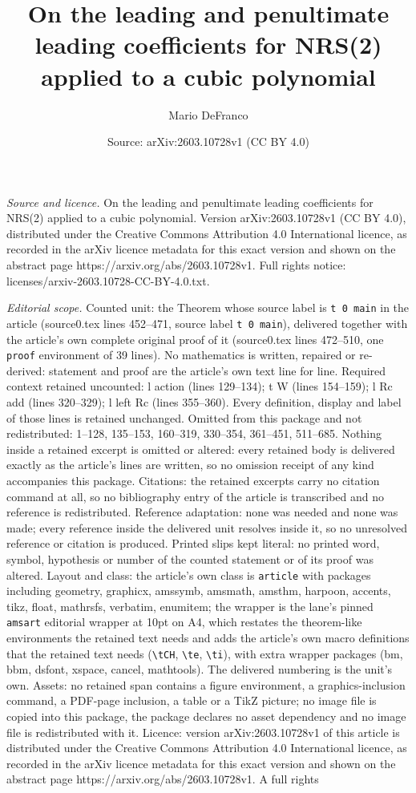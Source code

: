 \documentclass[10pt,a4paper]{amsart}
\title[On the leading and penultimate leading coefficients for NRS(]{On the leading and penultimate leading coefficients for NRS(2) applied to a cubic polynomial}
\author{Mario DeFranco}
\date{Source: arXiv:2603.10728v1 (CC BY 4.0)}
\begin{document}
\maketitle

\noindent\emph{Source and licence.} On the leading and penultimate leading coefficients for NRS(2) applied to a cubic polynomial. Version arXiv:2603.10728v1 (CC BY 4.0), distributed under the Creative Commons Attribution 4.0 International licence, as recorded in the arXiv licence metadata for this exact version and shown on the abstract page https://arxiv.org/abs/2603.10728v1. Full rights notice: licenses/arxiv-2603.10728-CC-BY-4.0.txt.\par\smallskip

\noindent\textit{Editorial scope.} Counted unit: the Theorem whose source label is \texttt{t 0 main} in the article (source0.tex lines 452--471, source label \texttt{t 0 main}), delivered together with the article's own complete original proof of it (source0.tex lines 472--510, one \texttt{proof} environment of 39 lines). No mathematics is written, repaired or re-derived: statement and proof are the article's own text line for line. Required context retained uncounted: l action (lines 129--134); t W (lines 154--159); l Rc add (lines 320--329); l left Rc (lines 355--360). Every definition, display and label of those lines is retained unchanged. Omitted from this package and not redistributed: 1--128, 135--153, 160--319, 330--354, 361--451, 511--685. Nothing inside a retained excerpt is omitted or altered: every retained body is delivered exactly as the article's lines are written, so no omission receipt of any kind accompanies this package. Citations: the retained excerpts carry no citation command at all, so no bibliography entry of the article is transcribed and no reference is redistributed. Reference adaptation: none was needed and none was made; every reference inside the delivered unit resolves inside it, so no unresolved reference or citation is produced. Printed slips kept literal: no printed word, symbol, hypothesis or number of the counted statement or of its proof was altered. Layout and class: the article's own class is \texttt{article} with packages including geometry, graphicx, amssymb, amsmath, amsthm, harpoon, accents, tikz, float, mathrsfs, verbatim, enumitem; the wrapper is the lane's pinned \texttt{amsart} editorial wrapper at 10pt on A4, which restates the theorem-like environments the retained text needs and adds the article's own macro definitions that the retained text needs (\texttt{\textbackslash tCH}, \texttt{\textbackslash te}, \texttt{\textbackslash ti}), with extra wrapper packages (bm, bbm, dsfont, xspace, cancel, mathtools). The delivered numbering is the unit's own. Assets: no retained span contains a figure environment, a graphics-inclusion command, a PDF-page inclusion, a table or a TikZ picture; no image file is copied into this package, the package declares no asset dependency and no image file is redistributed with it. Licence: version arXiv:2603.10728v1 of this article is distributed under the Creative Commons Attribution 4.0 International licence, as recorded in the arXiv licence metadata for this exact version and shown on the abstract page https://arxiv.org/abs/2603.10728v1. A full rights 
\end{document}
